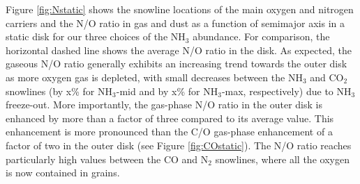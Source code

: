 \documentclass[apj]{emulateapj}
\newcommand{\emgr}[1]{\emph{ \color{gray} #1}}
\begin{document}
Figure \ref{fig:Nstatic} shows the snowline locations of the main oxygen and nitrogen carriers and the N/O ratio in gas and dust as a function of semimajor axis in a static disk for our three choices of the NH$_3$ abundance. For comparison, the horizontal dashed line shows the average N/O ratio in the disk. As expected, the gaseous N/O ratio generally exhibits an increasing trend towards the outer disk as more oxygen gas is depleted, with small decreases between the NH$_3$ and CO$_2$ snowlines (by x\% for NH$_3$-mid and by x\% for NH$_3$-max, respectively) due to NH$_3$ freeze-out. More importantly, the gas-phase N/O ratio in the outer disk is enhanced by more than a factor of three compared to its average value. This enhancement is more pronounced than the C/O gas-phase enhancement of a factor of two in the outer disk (see Figure \ref{fig:COstatic}). The N/O ratio reaches particularly high values between the CO and N$_2$ snowlines, where all the oxygen is now contained in grains. 


\end{document}
